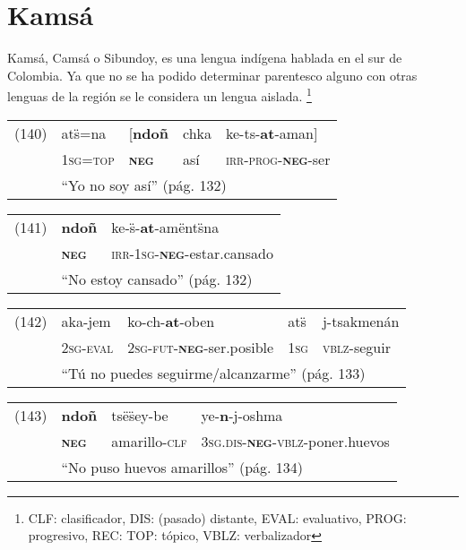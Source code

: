 \section*{Kamsá}

\noindent Kamsá, Camsá o Sibundoy, es una lengua indígena hablada en el sur de Colombia. Ya que no se ha podido determinar parentesco alguno con otras lenguas de la región se le considera un lengua aislada.
\footnote{CLF: clasificador, DIS: (pasado) distante, EVAL: evaluativo, PROG: progresivo, REC: TOP: tópico, VBLZ: verbalizador}
\vspace{0.5cm}

{\setmainfont{Charis SIL}

\begin{tabular}{lllll}
(140) & ats̈=na & [\textbf{ndoñ} & chka & ke-ts-\textbf{at}-aman] \\
& \textsc{1sg=top} & \textsc{\textbf{neg}} & así & \textsc{irr-prog-\textbf{neg}-}ser \\
& \multicolumn{4}{l}{``Yo no soy así'' (pág. 132)}
\end{tabular} \vspace{0.5cm}

\begin{tabular}{lll}
(141) & \textbf{ndoñ} & ke-s̈-\textbf{at}-amënts̈na \\
& \textsc{\textbf{neg}} & \textsc{irr-1sg-\textbf{neg}-}estar.cansado \\
& \multicolumn{2}{l}{``No estoy cansado'' (pág. 132)}
\end{tabular} \vspace{0.5cm}

\begin{tabular}{lllll}
(142) & aka-jem & ko-ch-\textbf{at}-oben & ats̈ & j-tsakmenán \\
& \textsc{2sg-eval} & \textsc{2sg-fut-\textbf{neg}-}ser.posible & \textsc{1sg} & \textsc{vblz-}seguir \\
& \multicolumn{4}{l}{``Tú no puedes seguirme/alcanzarme'' (pág. 133)}
\end{tabular} \vspace{0.5cm}

\begin{tabular}{llll}
(143) & \textbf{ndoñ} & tsës̈ey-be & ye-\textbf{n}-j-oshma \\
& \textsc{\textbf{neg}} & amarillo-\textsc{clf} & \textsc{3sg.dis-\textbf{neg}-vblz-}poner.huevos \\
& \multicolumn{3}{l}{``No puso huevos amarillos'' (pág. 134)}
\end{tabular} \vspace{0.5cm}

}
